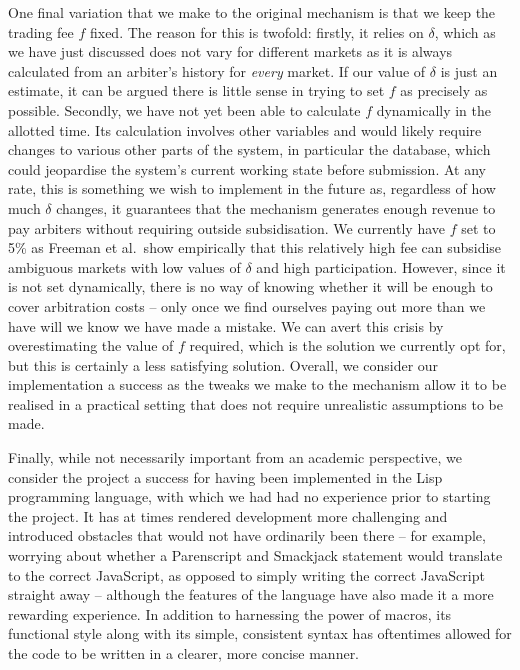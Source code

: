 One final variation that we make to the original mechanism is that we keep the
trading fee $f$ fixed. The reason for this is twofold: firstly, it relies on
$\delta$, which as we have just discussed does not vary for different markets
as it is always calculated from an arbiter's history for \emph{every} market.
If our value of $\delta$ is just an estimate, it can be argued there is little
sense in trying to set $f$ as precisely as possible. Secondly, we have not yet
been able to calculate $f$ dynamically in the allotted time. Its calculation
involves other variables and would likely require changes to various other
parts of the system, in particular the database, which could jeopardise the
system's current working state before submission. At any rate, this is
something we wish to implement in the future as, regardless of how much
$\delta$ changes, it guarantees that the mechanism generates enough revenue to
pay arbiters without requiring outside subsidisation. We currently have $f$ set
to 5\% as Freeman et al.\ show empirically that this relatively high fee can
subsidise ambiguous markets with low values of $\delta$ and high participation.
However, since it is not set dynamically, there is no way of knowing whether it
will be enough to cover arbitration costs -- only once we find ourselves paying
out more than we have will we know we have made a mistake. We can avert this
crisis by overestimating the value of $f$ required, which is the solution we
currently opt for, but this is certainly a less satisfying solution. Overall,
we consider our implementation a success as the tweaks we make to the mechanism
allow it to be realised in a practical setting that does not require
unrealistic assumptions to be made.

Finally, while not necessarily important from an academic perspective, we
consider the project a success for having been implemented in the Lisp
programming language, with which we had had no experience prior to starting the
project. It has at times rendered development more challenging and introduced
obstacles that would not have ordinarily been there -- for example, worrying
about whether a Parenscript and Smackjack statement would translate to the
correct JavaScript, as opposed to simply writing the correct JavaScript
straight away -- although the features of the language have also made it a more
rewarding experience. In addition to harnessing the power of macros, its
functional style along with its simple, consistent syntax has oftentimes
allowed for the code to be written in a clearer, more concise manner.

